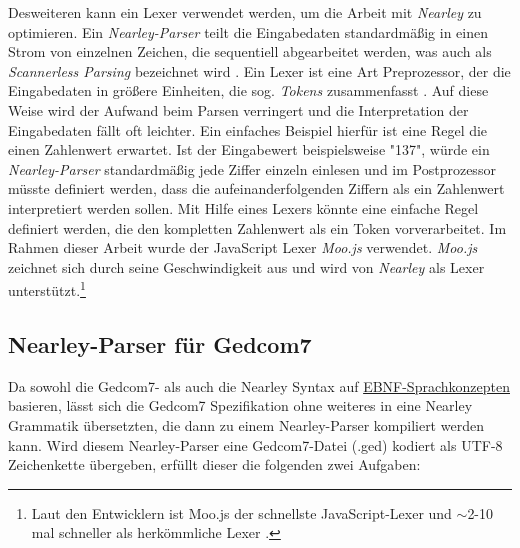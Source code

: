 Desweiteren kann ein Lexer verwendet werden, um die Arbeit mit \textit{Nearley} zu optimieren. Ein \textit{Nearley-Parser} teilt die Eingabedaten standardmäßig in einen Strom von einzelnen Zeichen, die sequentiell abgearbeitet werden, was auch als \textit{Scannerless Parsing} bezeichnet wird \cite{NearleyDoc}. Ein Lexer ist eine Art Preprozessor, der die Eingabedaten in größere Einheiten, die sog. \textit{Tokens} zusammenfasst \cite{NearleyDoc}. Auf diese Weise wird der Aufwand beim Parsen verringert und die Interpretation der Eingabedaten fällt oft leichter. Ein einfaches Beispiel hierfür ist eine Regel die einen Zahlenwert erwartet. Ist der Eingabewert beispielsweise "137", würde ein \textit{Nearley-Parser} standardmäßig jede Ziffer einzeln einlesen und im Postprozessor müsste definiert werden, dass die aufeinanderfolgenden Ziffern als ein Zahlenwert interpretiert werden sollen. Mit Hilfe eines Lexers könnte eine einfache Regel definiert werden, die den kompletten Zahlenwert als ein Token vorverarbeitet. Im Rahmen dieser Arbeit wurde der JavaScript Lexer \textit{Moo.js} \cite{MooDoc} verwendet. \textit{Moo.js} zeichnet sich durch seine Geschwindigkeit aus und wird von \textit{Nearley} als Lexer unterstützt.\footnote{Laut den Entwicklern ist Moo.js der schnellste JavaScript-Lexer und $\sim$2-10 mal schneller als herkömmliche Lexer \cite{MooDoc}.} 
\newpage
\subsection{Nearley-Parser für Gedcom7}
\label{subsec: Konzept - Gedcom Grammatik - Nearley-Parser für Gedcom7}
Da sowohl die Gedcom7- als auch die Nearley Syntax auf \hyperref[sec: Nearley]{EBNF-Sprachkonzepten} basieren, lässt sich die Gedcom7 Spezifikation ohne weiteres in eine Nearley Grammatik übersetzten, die dann zu einem Nearley-Parser kompiliert werden kann. Wird diesem Nearley-Parser eine Gedcom7-Datei (.ged) kodiert als UTF-8 Zeichenkette übergeben, erfüllt dieser die folgenden zwei Aufgaben:


